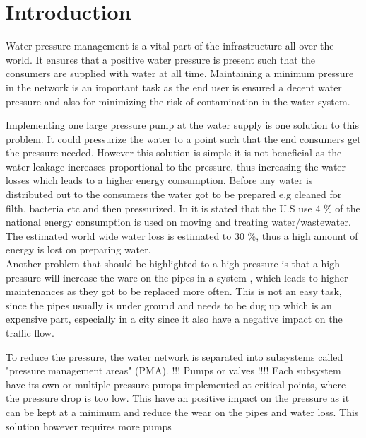 \chapter{Introduction}

Water pressure management is a vital part of the infrastructure all over the world. It ensures that a positive water pressure is present such that the consumers are supplied with water at all time. Maintaining a minimum pressure in the network is an important task as the end user is ensured a decent water pressure and also for minimizing the risk of contamination in the water system\cite{national2005public}.%

Implementing one large pressure pump at the water supply is one solution to this problem. It could pressurize the water to a point such that the end consumers get the pressure needed. However this solution is simple it is not beneficial as the water leakage increases proportional to the pressure\cite{feldman2009aspects}, thus increasing the water losses which leads to a higher energy consumption. Before any water is distributed out to the consumers the water got to be prepared e.g cleaned for filth, bacteria etc and then pressurized. In \cite{appelbaum2002water} it is stated that the U.S use 4 \% of the national energy consumption is used on moving and treating water/wastewater. The estimated world wide water loss is estimated to 30 \%\cite{feldman2009aspects}, thus a high amount of energy is lost on preparing water.\\ 
Another problem that should be highlighted to a high pressure is that a high pressure will increase the ware on the pipes in a system\cite{Watts_water} , which leads to higher maintenances as they got to be replaced more often. This is not an easy task, since the pipes usually is under ground and needs to be dug up which is an expensive part, especially in a city since it also have a negative impact on the traffic flow. 

To reduce the pressure, the water network is separated into subsystems called "pressure management areas" (PMA). !!! Pumps or valves !!!! 
Each subsystem have its own or multiple pressure pumps implemented at critical points, where the pressure drop is too low. This have an positive impact on the pressure as it can be kept at a minimum and reduce the wear on the pipes and water loss. This solution however requires more pumps 




